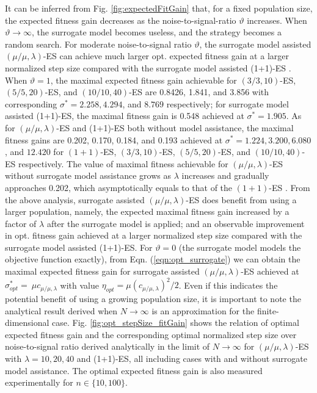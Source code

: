 It can be inferred from Fig. \ref{fig:expectedFitGain} that, for a fixed population size, the expected fitness gain decreases as the noise-to-signal-ratio $\vartheta$ increases. When $\vartheta \rightarrow \infty$, the surrogate model becomes useless, and the strategy becomes a random search. For moderate noise-to-signal ratio $\vartheta$, the surrogate model assisted $(\mu/\mu,\lambda)$-ES can achieve much larger opt. expected fitness gain at a larger normalized step size compared with the surrogate model assisted (1+1)-ES \cite{DBLP:conf/ppsn/KayhaniA18}. When $\vartheta = 1$, the maximal expected fitness gain achievable for $(3/3,10)$-ES, $(5/5,20)$-ES, and $(10/10,40)$-ES are 0.8426, 1.841, and 3.856 with corresponding $\sigma^*=2.258,4.294$, and $8.769$ respectively; for surrogate model assisted (1+1)-ES, the maximal fitness gain is 0.548 achieved at $\sigma^* = 1.905$. As for $(\mu/\mu,\lambda)$-ES and (1+1)-ES both without model assistance, the maximal fitness gains are 0.202, 0.170, 0.184, and 0.193 achieved at $\sigma^*=1.224,3.200,6.080$, and $12.420$ for $(1+1)$-ES, $(3/3,10)$-ES, $(5/5,20)$-ES, and $(10/10,40)$-ES respectively. The value of maximal fitness achievable for $(\mu/\mu,\lambda)$-ES without surrogate model assistance grows as $\lambda$ increases and gradually approaches 0.202, which asymptotically equals to that of the $(1+1)$-ES \cite{Beyer:1995:TTE:1326683.1326688}. From the above analysis, surrogate assisted $(\mu/\mu,\lambda)$-ES does benefit from using a larger population, namely, the expected maximal fitness gain increased by a factor of $\lambda$ after the surrogate model is applied; and an observable improvement in opt. fitness gain achieved at a larger normalized step size compared with the surrogate model assisted (1+1)-ES. For $\vartheta=0$ (the surrogate model models the objective function exactly), from Eqn. (\ref{eqn:opt_surrogate}) we can obtain the maximal expected fitness gain for surrogate assisted $(\mu/\mu,\lambda)$-ES achieved at $\sigma^*_{opt} = \ \mu c_{\mu / \mu, \lambda}$ with value $\eta_{opt} =  \mu (c_{\mu / \mu, \lambda})^2/2$. Even if this indicates the potential benefit of using a growing population size, it is important to note the analytical result derived when $N \rightarrow \infty$ is an approximation for the finite-dimensional case. Fig. \ref{fig:opt_stepSize_fitGain} shows the relation of optimal expected fitness gain and the corresponding optimal normalized step size over noise-to-signal ratio derived analytically in the limit of $N \rightarrow \infty$ for $(\mu/\mu,\lambda)$-ES with $\lambda=10,20,40$ and (1+1)-ES, all including cases with and without surrogate model assistance. The optimal expected fitness gain is also measured experimentally for $n \in \{10,100 \}$. 
   
